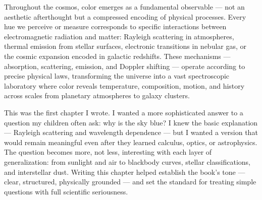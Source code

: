 Throughout the cosmos, color emerges as a fundamental observable — not an aesthetic afterthought but a compressed encoding of physical processes. Every hue we perceive or measure corresponds to specific interactions between electromagnetic radiation and matter: Rayleigh scattering in atmospheres, thermal emission from stellar surfaces, electronic transitions in nebular gas, or the cosmic expansion encoded in galactic redshifts. These mechanisms — absorption, scattering, emission, and Doppler shifting — operate according to precise physical laws, transforming the universe into a vast spectroscopic laboratory where color reveals temperature, composition, motion, and history across scales from planetary atmospheres to galaxy clusters.

\begin{commentary}
This was the first chapter I wrote. I wanted a more sophisticated answer to a question my children often ask: why is the sky blue? I knew the basic explanation --- Rayleigh scattering and wavelength dependence --- but I wanted a version that would remain meaningful even after they learned calculus, optics, or astrophysics. The question becomes more, not less, interesting with each layer of generalization: from sunlight and air to blackbody curves, stellar classifications, and interstellar dust. Writing this chapter helped establish the book's tone --- clear, structured, physically grounded --- and set the standard for treating simple questions with full scientific seriousness.
\end{commentary}